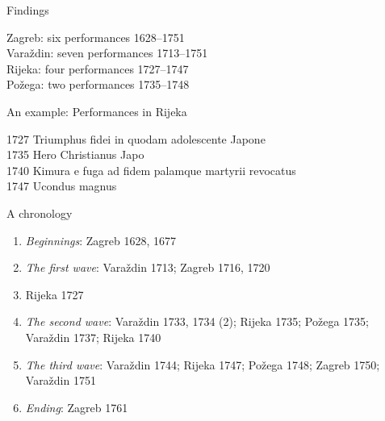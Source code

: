 \documentclass[14pt]{beamer}
\begin{document}
{
    \begin{frame}[plain]
    \end{frame}
    }

\begin{frame}{Findings}

Zagreb: \alert{six} performances 1628–1751\\
Varaždin: \alert{seven} performances 1713–1751\\
Rijeka: \alert{four} performances 1727–1747\\
Požega: \alert{two} performances 1735–1748

\end{frame}

\begin{frame}{An example: Performances in Rijeka}

\alert{1727} Triumphus fidei in quodam adolescente Japone\\
\alert{1735} Hero Christianus Japo\\
\alert{1740} Kimura e fuga ad fidem palamque martyrii revocatus\\
\alert{1747} Ucondus magnus

\end{frame}

\begin{frame}{A chronology}

\begin{enumerate}
\item \emph{Beginnings}: Zagreb 1628, 1677
\item \emph{The first wave}: Varaždin 1713; Zagreb 1716, 1720
\item Rijeka 1727
\item \emph{The second wave}: Varaždin 1733, 1734 (2); Rijeka 1735; Požega 1735; Varaždin 1737; Rijeka 1740
\item \emph{The third wave}: Varaždin 1744; Rijeka 1747; Požega 1748; Zagreb 1750; Varaždin 1751
\item \emph{Ending}: Zagreb 1761
\end{enumerate}

\end{frame}
\end{document}
